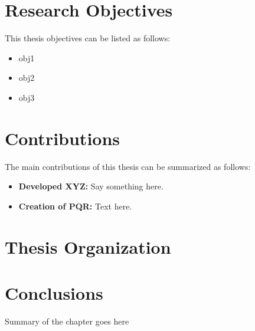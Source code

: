\section{Research Objectives}

This thesis objectives can be listed as follows:

\begin{itemize}
	\item obj1
	\item obj2
	\item obj3
\end{itemize}

\section{Contributions}
The main contributions of this thesis can be summarized as follows:
\begin{itemize}
	\item \textbf{Developed XYZ:} Say something here.
	\item \textbf{Creation of PQR:} Text here.
\end{itemize}

\section{Thesis Organization}

\section{Conclusions}
Summary of the chapter goes here